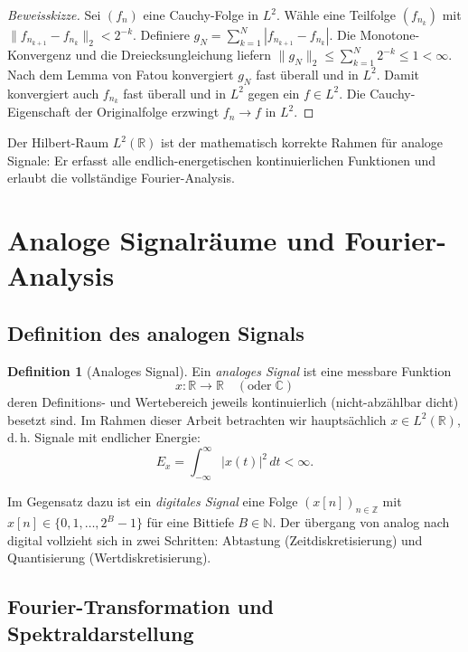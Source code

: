 ﻿\documentclass[a4paper,12pt]{article}
\theoremstyle{definition}
\newtheorem{definition}{Definition}
\begin{document}
\begin{proof}[Beweisskizze]
Sei $(f_n)$ eine Cauchy-Folge in $L^2$.  Wähle eine Teilfolge $(f_{n_k})$ mit
$\|f_{n_{k+1}} - f_{n_k}\|_2 < 2^{-k}$.  Definiere
$g_N = \sum_{k=1}^N |f_{n_{k+1}} - f_{n_k}|$.
Die Monotone-Konvergenz und die Dreiecksungleichung liefern
$\|g_N\|_2 \leq \sum_{k=1}^N 2^{-k} \leq 1 < \infty$.
Nach dem Lemma von Fatou konvergiert $g_N$ fast überall und in $L^2$.
Damit konvergiert auch $f_{n_k}$ fast überall und in $L^2$ gegen ein $f \in L^2$.
Die Cauchy-Eigenschaft der Originalfolge erzwingt $f_n \to f$ in $L^2$.
\end{proof}

Der Hilbert-Raum $L^2(\mathbb{R})$ ist der mathematisch korrekte Rahmen für
analoge Signale: Er erfasst alle endlich-energetischen kontinuierlichen Funktionen
und erlaubt die vollständige Fourier-Analysis.

\section{Analoge Signalräume und Fourier-Analysis}
\label{sec:signale}

\subsection{Definition des analogen Signals}

\begin{definition}[Analoges Signal]
\label{def:analoges_signal}
Ein \emph{analoges Signal} ist eine messbare Funktion
\[
x: \mathbb{R} \to \mathbb{R} \quad (\text{oder} \; \mathbb{C})
\]
deren Definitions- und Wertebereich jeweils kontinuierlich (nicht-abzählbar dicht)
besetzt sind.  Im Rahmen dieser Arbeit betrachten wir hauptsächlich
$x \in L^2(\mathbb{R})$, d.\,h. Signale mit endlicher Energie:
\[
E_x = \int_{-\infty}^{\infty} |x(t)|^2 \, dt < \infty.
\]
\end{definition}

Im Gegensatz dazu ist ein \emph{digitales Signal} eine Folge $(x[n])_{n \in \mathbb{Z}}$
mit $x[n] \in \{0,1,\ldots,2^B-1\}$ für eine Bittiefe $B \in \mathbb{N}$.
Der übergang von analog nach digital vollzieht sich in zwei Schritten:
Abtastung (Zeitdiskretisierung) und Quantisierung (Wertdiskretisierung).

\subsection{Fourier-Transformation und Spektraldarstellung}
\end{document}
